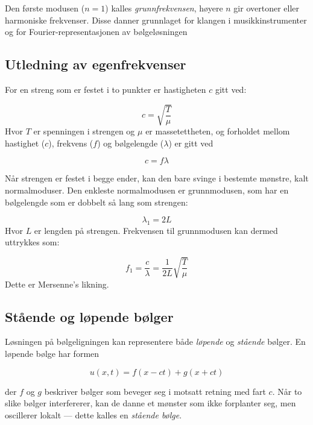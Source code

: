 Den første modusen ($n=1$) kalles \textit{grunnfrekvensen}, høyere $n$ gir overtoner eller harmoniske frekvenser.  
Disse danner grunnlaget for klangen i musikkinstrumenter og for Fourier-representasjonen av bølgeløsningen \parencite{physicsClassroomFundamental}

\subsection{Utledning av egenfrekvenser}
For en streng som er festet i to punkter er hastigheten $c$ gitt ved:

\begin{equation*}
    c = \sqrt{\frac{T}{\mu}}
\end{equation*}
Hvor $T$ er spenningen i strengen og $\mu$ er massetettheten, og forholdet mellom hastighet
($c$), frekvens ($f$) og bølgelengde ($\lambda$) er gitt ved

\begin{equation*}
    c = f \lambda
\end{equation*}  

Når strengen er festet i begge ender, kan den bare svinge i bestemte mønstre, kalt normalmoduser.
Den enkleste normalmodusen er grunnmodusen, som har en bølgelengde som er dobbelt så lang som strengen:

\begin{equation*}
    \lambda_1 = 2L
\end{equation*}
Hvor $L$ er lengden på strengen.
Frekvensen til grunnmodusen kan dermed uttrykkes som:

\begin{equation*}
    f_1 = \frac{c}{\lambda} = \frac{1}{2L} \sqrt{\frac{T}{\mu}}
\end{equation*}
Dette er Mersenne's likning.

\subsection{Stående og løpende bølger}

Løsningen på bølgeligningen kan representere både \textit{løpende} og \textit{stående} bølger.  
En løpende bølge har formen

\begin{equation*}
u(x,t) = f(x - ct) + g(x + ct)
\end{equation*}

der $f$ og $g$ beskriver bølger som beveger seg i motsatt retning med fart $c$.  
Når to slike bølger interfererer, kan de danne et mønster som ikke forplanter seg, men oscillerer lokalt — dette kalles en \textit{stående bølge}.  

